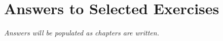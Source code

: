 
\chapter{Answers to Selected Exercises}

%

\textit{Answers will be populated as chapters are written.}
